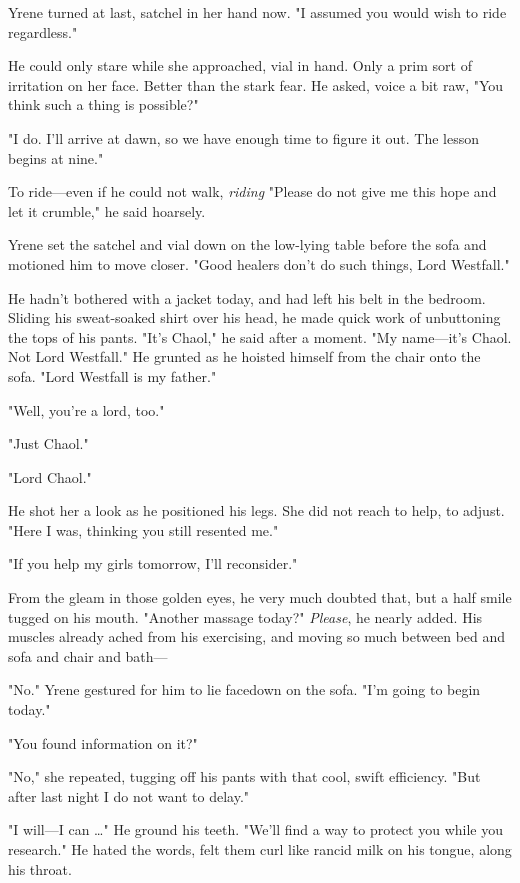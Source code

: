 Yrene turned at last, satchel in her hand now. "I assumed you would wish to ride regardless."

He could only stare while she approached, vial in hand. Only a prim sort of irritation on her face. Better than the stark fear. He asked, voice a bit raw, "You think such a thing is possible?"

"I do. I'll arrive at dawn, so we have enough time to figure it out. The lesson begins at nine."

To ride---even if he could not walk, \emph{riding}  "Please do not give me this hope and let it crumble," he said hoarsely.

Yrene set the satchel and vial down on the low-lying table before the sofa and motioned him to move closer. "Good healers don't do such things, Lord Westfall."

He hadn't bothered with a jacket today, and had left his belt in the bedroom. Sliding his sweat-soaked shirt over his head, he made quick work of unbuttoning the tops of his pants. "It's Chaol," he said after a moment. "My name---it's Chaol. Not Lord Westfall." He grunted as he hoisted himself from the chair onto the sofa. "Lord Westfall is my father."

"Well, you're a lord, too."

"Just Chaol."

"Lord Chaol."

He shot her a look as he positioned his legs. She did not reach to help, to adjust. "Here I was, thinking you still resented me."

"If you help my girls tomorrow, I'll reconsider."

From the gleam in those golden eyes, he very much doubted that, but a half smile tugged on his mouth. "Another massage today?"
\emph{Please}, he nearly added. His muscles already ached from his exercising, and moving so much between bed and sofa and chair and bath---

"No." Yrene gestured for him to lie facedown on the sofa. "I'm going to begin today."

"You found information on it?"

"No," she repeated, tugging off his pants with that cool, swift efficiency. "But after last night  I do not want to delay."

"I will---I can \ldots" He ground his teeth. "We'll find a way to protect you while you research." He hated the words, felt them curl like rancid milk on his tongue, along his throat.

